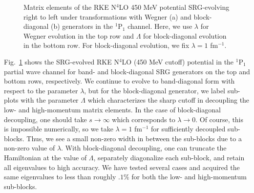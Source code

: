 \documentclass[preprintnumbers,floatfix,aps,prc,preprint,nofootinbib]{revtex4-1}
\begin{document}
%
\begin{figure}[H]
	\centering
	
	\caption{Matrix elements of the RKE N$^4$LO 450 MeV potential SRG-evolving right to left under transformations with Wegner (a) and block-diagonal (b) generators in the $^1$P$_1$ channel. Here, we use $\lambda$ for Wegner evolution in the top row and $\Lambda$ for block-diagonal evolution in the bottom row. For block-diagonal evolution, we fix $\lambda=1$ fm$^{-1}$.}
	\label{fig:potential_contours_1P1_RKE}
\end{figure}
%
Fig.~\ref{fig:potential_contours_1P1_RKE} shows the SRG-evolved RKE N$^4$LO (450 MeV cutoff) potential in the $^1$P$_1$ partial wave channel for band- and block-diagonal SRG generators on the top and bottom rows, respectively. We continue to evolve to band-diagonal form with respect to the parameter $\lambda$, but for the block-diagonal generator, we label sub-plots with the parameter $\Lambda$ which characterizes the sharp cutoff in decoupling the low- and high-momentum matrix elements. In the case of block-diagonal decoupling, one should take $s \rightarrow \infty$ which corresponds to $\lambda \rightarrow 0$. Of course, this is impossible numerically, so we take $\lambda=1$ fm$^{-1}$ for sufficiently decoupled sub-blocks. Thus, we see a small non-zero width in between the sub-blocks due to a non-zero value of $\lambda$. With block-diagonal decoupling, one can truncate the Hamiltonian at the value of $\Lambda$, separately diagonalize each sub-block, and retain all eigenvalues to high accuracy. We have tested several cases and acquired the same eigenvalues to less than roughly $.1$\% for both the low- and high-momentum sub-blocks.
%
\end{document}
